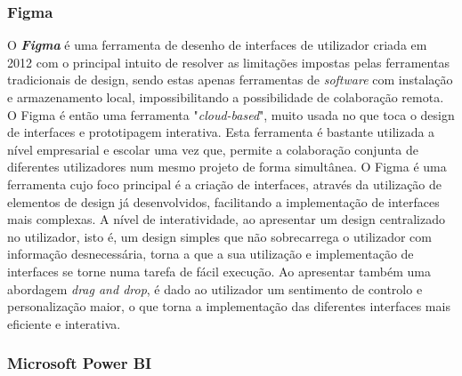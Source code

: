 \subsubsection{Figma} %
\label{ssub:figma}

O \textbf{\textit{Figma}} \cite{figma} é uma ferramenta de desenho de interfaces de utilizador criada em 2012 com o principal intuito de resolver as limitações impostas pelas ferramentas tradicionais de design, sendo estas apenas ferramentas de \textit{software} com instalação e armazenamento local, impossibilitando a possibilidade de colaboração remota. O Figma é então uma ferramenta "\textit{cloud-based}", muito usada no que toca o design de interfaces e prototipagem interativa. Esta ferramenta é bastante utilizada a nível empresarial e escolar uma vez que, permite a colaboração conjunta de diferentes utilizadores num mesmo projeto de forma simultânea. O Figma é uma ferramenta cujo foco principal é a criação de interfaces, através da utilização de elementos de design já desenvolvidos, facilitando a implementação de interfaces mais complexas. A nível de interatividade, ao apresentar um design centralizado no utilizador, isto é, um design simples que não sobrecarrega o utilizador com informação desnecessária, torna a que a sua utilização e implementação de interfaces se torne numa tarefa de fácil execução. Ao apresentar também uma abordagem \textit{drag and drop}, é dado ao utilizador um sentimento de controlo e personalização maior, o que torna a implementação das diferentes interfaces mais eficiente e interativa.  %

\subsubsection{Microsoft Power BI} %
\label{ssub:microsoft}

